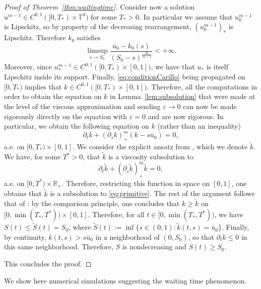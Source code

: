 \documentclass[11pt]{article}
\numberwithin{equation}{section} %
\newcommand{\p}{{\partial}}
\newcommand{\R}{{\mathbb{R}}}
\newcommand{\T}{{\mathbb{T}}}
\newcommand{\eps}{\varepsilon}
\begin{document}
\begin{proof}[Proof of Theorem~\ref{thm:waitingtime}]
Consider now a solution $u^{m-1}\in C^{0,1}([0,T_*)\times \T^d)$ for some $T_*>0$. In particular we assume that $u_{0}^{m-1}$ is Lipschitz, so by property of the decreasing rearrangement, $(u_{0}^{m-1})_{*}$ is Lipschitz. Therefore $k_{0}$ satisfies
\begin{equation}\label{eq:conditionCarillo}
    \limsup_{s\to S_0^{-}}\frac{\bar u_0 - k_0(s)}{(S_0-s)^\frac{m}{m-1}} < +\infty.
\end{equation}
Moreover, since $u^{m-1}_* \in C^{0,1}([0,T_*)\times [0,1])$, we have that $u_*$ is itself Lipschitz inside its support. Finally, \eqref{eq:conditionCarillo} being propagated on $[0,T_*)$ implies that $k\in C^{0,1}([0,T_*)\times [0,1])$. Therefore, all the computations in order to obtain the equation on $k$ in Lemma~\ref{lem:subsolution} that were made at the level of the viscous approximation and sending $\varepsilon\to 0$ can now be made rigorously directly on the equation with $\eps=0$ and are now rigorous. In particular, we obtain the following equation on $k$ (rather than an inequality)
\begin{equation}
    \p_t k + (\p_sk)^m_+(k-s\bar u_0) = 0,
\end{equation}
a.e. on $[0,T_*)\times [0,1]$.  We consider the explicit ansatz from \cite[Equation (4.32)]{CGV2022vortex}, which we denote $\tilde k$. We have, for some $T^*>0$, that $\tilde k $ is a viscosity subsolution to 
\begin{equation}
    \p_t \tilde k + (\p_s \tilde k)_+^m \tilde k = 0,
\end{equation}
a.e. on $[0,T^*)\times \R_+$. Therefore, restricting this function in space on $[0,1]$, one obtains that $\tilde k$ is a subsolution to \eqref{eq:primitive}. The rest of the argument follows that of \cite[Corollary 4.9]{CGV2022vortex}: by the comparison principle, one concludes that $k\ge \tilde k$ on $[0,\min (T_*, T^*))\times [0,1]$. Therefore, for all $t\in [0,\min (T_*, T^*))$, we have $S(t)\le \tilde S(t) = S_0$, where $\tilde S(t) := \inf \{s\in (0,1) : \tilde k(t,s) = \bar u_0\}$. Finally, by continuity, $k(t,s) > s\bar u_0 $ in a neighborhood of $(0,S_0)$, so that $\p_t k\le 0$ in this same neighborhood. Therefore, $S$ is nondecreasing and $S(t) \ge S_0$.

This concludes the proof.  
\end{proof}


We show here numerical simulations suggesting the waiting time phenomenon. 
\end{document}
